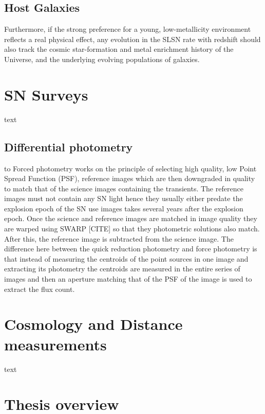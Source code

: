 \subsection{Host Galaxies}
Furthermore, if the strong preference for a young,
low-metallicity environment reflects a real physical effect, any
evolution in the SLSN rate with redshift should also track the cosmic
star-formation and metal enrichment history of the Universe, and the
underlying evolving populations of galaxies.

\section{SN Surveys}
text

\subsection{Differential photometry}
to Forced photometry works on the principle of selecting high quality, low Point Spread Function (PSF), reference images which are then downgraded in quality to match that of the science images containing the transients. The reference images must not contain any SN light hence they usually either predate the explosion epoch of the SN use images takes several years after the explosion epoch. Once the science and reference images are matched in image quality they are warped using SWARP [CITE] so that they photometric solutions also match. After this, the reference image is subtracted from the science image. The difference here between the quick reduction photometry and force photometry is that instead of measuring the centroids of the point sources in one image and extracting its photometry the centroids are measured in the entire series of images and then an aperture matching that of the PSF of the image is used to extract the flux count.

\section{Cosmology and Distance measurements}
text

\section{Thesis overview}
